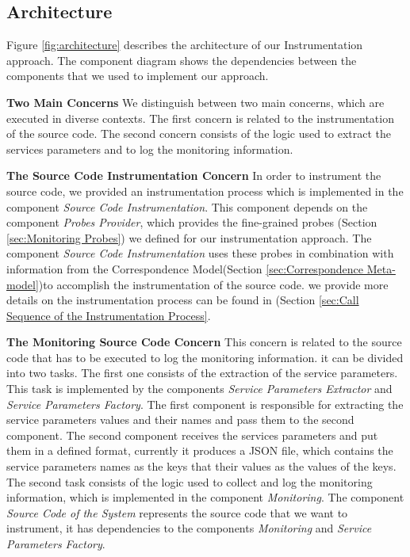 \subsection{Architecture}
\label{sec:architecture}
Figure \ref{fig:architecture} describes the architecture of our Instrumentation approach. The component diagram shows the dependencies between the components that we used to implement our approach. 

\textbf{Two Main Concerns}
We distinguish between two main concerns, which are executed in diverse contexts. The first concern is related to the instrumentation of the source code. The second concern consists of the logic used to extract the services parameters and to log the monitoring information.  

\textbf{The Source Code Instrumentation Concern}
In order to instrument the source code, we provided an instrumentation process which is implemented in the component \textit{Source Code Instrumentation}. This component depends on the component \textit{Probes Provider}, which provides the fine-grained probes (Section \ref{sec:Monitoring Probes}) we defined for our instrumentation approach. The component \textit{Source Code Instrumentation} uses these probes in combination with information from the Correspondence Model(Section \ref{sec:Correspondence Meta-model})to accomplish the instrumentation of the source code. we provide more details on the instrumentation process can be found in (Section \ref{sec:Call Sequence of the Instrumentation Process}.


\textbf{The Monitoring Source Code Concern}
This concern is related to the source code that has to be executed to log the monitoring information. it can be divided into two tasks. The first one consists of the extraction of the service parameters. This task is implemented by the components \textit{Service Parameters Extractor} and \textit{Service Parameters Factory}. The first component is responsible for extracting the service parameters values and their names and pass them to the second component. The second component receives the services parameters and put them in a defined format, currently it produces a JSON file, which contains the service parameters names as the keys that their values as the values of the keys. The second task consists of the logic used to collect and log the monitoring information, which is implemented in the component \textit{Monitoring}. The component \textit{Source Code of the System} represents the source code that we want to instrument, it has dependencies to the components \textit{Monitoring} and \textit{Service Parameters Factory}. 

